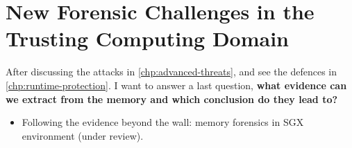 \chapter{New Forensic Challenges in the Trusting Computing Domain}
\label{chp:forensic}

After discussing the attacks in \ref{chp:advanced-threats}, and see the 
defences in \ref{chp:runtime-protection}.
I want to answer a last question, \textbf{what evidence can we extract from the 
memory and which conclusion do they lead to?}

\begin{itemize}
	\item Following the evidence beyond the wall: memory forensics in SGX
	environment (under review).
\end{itemize}